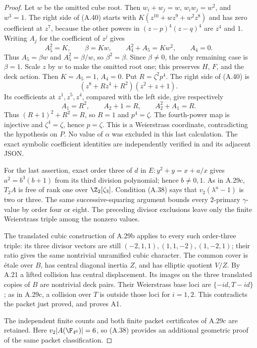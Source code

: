 \begin{proof}
Let $w$ be the omitted cube root. Then
$w_i+w_j=w$, $w_iw_j=w^2$, and $w^3=1$.
The right side of (A.40) starts with
$K(z^{10}+wz^9+w^2z^8)$ and has zero coefficient
at $z^7$, because the other powers in
$(z-p)^4(z-q)^4$ are $z^4$ and $1$.
Writing $A_j$ for the coefficient of $z^j$ gives
\[
 A_5^2=K,\qquad \beta=Kw,\qquad
 A_4^2+A_5=Kw^2,\qquad A_4=0.
\]
Thus $A_5=\beta w$ and $A_5^2=\beta/w$,
so $\beta^2=\beta$. Since $\beta\ne0$, the only
remaining case is $\beta=1$. Scale $z$ by $w$ to
make the omitted root one; this preserves $H$, $F$,
and the deck action. Then $K=A_5=1$, $A_4=0$.
Put $R=\zeta^2p^4$. The right side of (A.40) is
\[
 (z^8+Rz^4+R^2)(z^2+z+1).
\]
Its coefficients at $z^1,z^5,z^4$, compared with
the left side, give respectively
\[
 A_1=R^2,\qquad A_2+1=R,\qquad A_2^2+A_1=R.
\]
Thus $(R+1)^2+R^2=R$, so $R=1$ and $p^4=\zeta$.
The fourth-power map is injective and $\zeta^4=\zeta$,
hence $p=\zeta$. This is a Weierstrass coordinate,
contradicting the hypothesis on $P$. No value of
$\alpha$ was excluded in this last calculation.
The exact symbolic coefficient
identities are independently verified in
and its adjacent JSON.

For the last assertion, exact order three of $d$
in $E:y^2+y=x+a/x$ gives
$a^2=b^3(b+1)$ from its third division polynomial;
hence $b\ne0,1$. As in A.29c, $T_2A$ is free of
rank one over $\Z_2[\zeta_3]$. Condition (A.38)
says that $v_2(\lambda^u-1)$ is two or three.
The same successive-squaring argument bounds every
$2$-primary $\gamma$-value by order four or eight.
The preceding divisor exclusions leave only the
finite Weierstrass triple among the nonzero values.

The translated cubic construction of A.29b applies
to every such order-three triple: its three divisor
vectors are still $(-2,1,1),(1,1,-2),(1,-2,1)$;
their ratio gives the same nontrivial unramified
cubic character. The common cover is \'etale over
$B$, has central diagonal inertia $Z$, and has
elliptic quotient $V/Z$. By A.21 a lifted collision
has central displacement. Its images on the three
translated copies of $B$ are nontrivial deck pairs.
Their Weierstrass base loci are $\{-id,T-id\}$;
as in A.29c, a collision over $T$ is outside those
loci for $i=1,2$. This contradicts the packet just
proved, and proves A1.

The independent finite counts and both finite
packet certificates of A.29c are retained. Here
$v_2|A(\F_{4^6})|=6$, so (A.38)
provides an additional geometric proof of the
same packet classification.
\end{proof}

